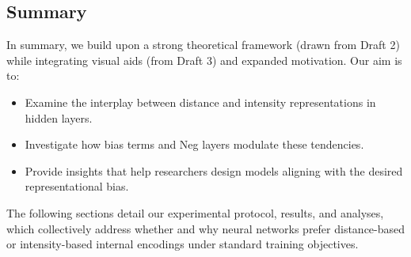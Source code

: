 \subsection{Summary}
In summary, we build upon a strong theoretical framework (drawn from Draft 2) while integrating visual aids (from Draft 3) and expanded motivation. Our aim is to:
\begin{itemize}
    \item Examine the interplay between distance and intensity representations in hidden layers.
    \item Investigate how bias terms and Neg layers modulate these tendencies.
    \item Provide insights that help researchers design models aligning with the desired representational bias.
\end{itemize}
The following sections detail our experimental protocol, results, and analyses, which collectively address whether and why neural networks prefer distance-based or intensity-based internal encodings under standard training objectives.


